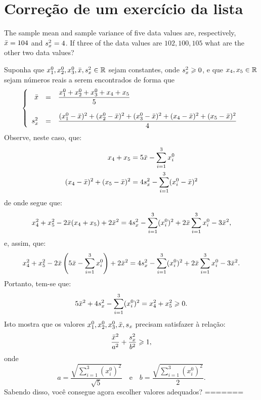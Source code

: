 \section{Correção de um exercício da lista}\label{sec:correcao-de-um-exercício-da-lista}

\begin{exercise}
  The sample mean and sample variance of five data values are, respectively,
  \(\bar{x}=104\) and \(s_{x}^{2}=4\). If three of the data
  values are \(102,100,105\) what are the other two data values?
\end{exercise}

Suponha que
\(x_{1}^{0},x_{2}^{0},x_{3}^{0},\bar{x},s_{x}^{2}\in\mathbb{R}\)
sejam constantes, onde \(s_{x}^{2}\geqslant{0}\), e que
\(x_{4},x_{5}\in\mathbb{R}\) sejam números reais a serem encontrados de forma que
\[
  \left\{
    \begin{array}{rcl}
      \bar{x}
      &=&
      \dfrac{
        x_{1}^{0}+x_{2}^{0}+x_{3}^{0}+x_{4}+x_{5}
      }{5}
      \\
      &&
      \\
      s_{x}^{2}
      &=&
      \dfrac{
        (x_{1}^{0}-\bar{x})^{2}
        +
        (x_{2}^{0}-\bar{x})^{2}
        +
        (x_{3}^{0}-\bar{x})^{2}
        +
        (x_{4}-\bar{x})^{2}
        +
        (x_{5}-\bar{x})^{2}
      }{4}
    \end{array}
  \right.
\]
Observe, neste caso, que:
\begin{align}
  x_{4}+x_{5}
  &=
  5\bar{x}
  -
  \sum_{i=1}^{3}x_{i}^{0}
  \\
  (x_{4}-\bar{x})^{2}
  +
  (x_{5}-\bar{x})^{2}
  &=
  4s_{x}^{2}
  -
  \sum_{i=1}^{3}(x_{i}^{0}-\bar{x})^{2}
\end{align}
de onde segue que:
\[
  x_{4}^{2}+x_{5}^{2}
  -
  2\bar{x}(x_{4}+x_{5})
  +
  2\bar{x}^{2}
  =
  4s_{x}^{2}
  -
  \sum_{i=1}^{3}(x_{i}^{0})^{2}
  +
  2\bar{x}\sum_{i=1}^{3}x_{i}^{0}
  -
  3\bar{x}^{2}
  ,
\]
e, assim, que:
\[
  x_{4}^{2}+x_{5}^{2}
  -
  2
  \bar{x}
  \left(
    5\bar{x}
    -
    \sum_{i=1}^{3}x_{i}^{0}
  \right)
  +
  2\bar{x}^{2}
  =
  4s_{x}^{2}
  -
  \sum_{i=1}^{3}(x_{i}^{0})^{2}
  +
  2\bar{x}\sum_{i=1}^{3}x_{i}^{0}
  -
  3\bar{x}^{2}.
\]
Portanto, tem-se que:
\[
  5\bar{x}^{2}+4s_{x}^{2}-\sum_{i=1}^{3}(x_{i}^{0})^{2}
  =
  x_{4}^{2}+x_{5}^{2}
  \geqslant{0}.
\]
Isto mostra que os valores
\(x_{1}^{0},x_{2}^{0},x_{3}^{0},\bar{x},s_{x}\)
precisam satisfazer à relação:
\[
  \frac{\bar{x}^{2}}{a^{2}}
  +
  \frac{s_{x}^{2}}{b^{2}}
  \geqslant{1}
  ,
\]
onde
\[
  a=\frac{\sqrt{\sum_{i=1}^{3}(x_{i}^{0})^{2}}}{\sqrt{5}}
  \quad
  \text{e}
  \quad
  b=\frac{\sqrt{\sum_{i=1}^{3}(x_{i}^{0})^{2}}}{2}
  .
\]
Sabendo disso, você consegue agora escolher valores adequados?
=======
